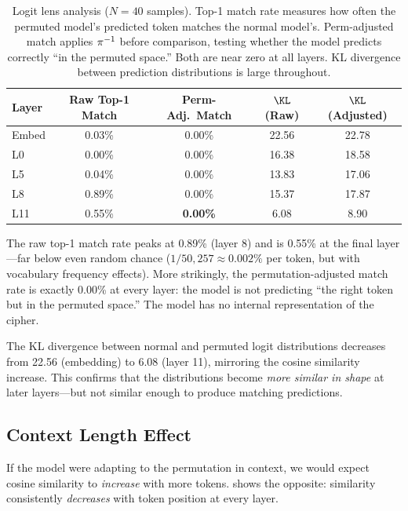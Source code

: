 \begin{table}[t]
    \centering
    \caption{Logit lens analysis ($N=40$ samples). Top-1 match rate measures how often the permuted model's predicted token matches the normal model's. Perm-adjusted match applies $\pi^{-1}$ before comparison, testing whether the model predicts correctly ``in the permuted space.'' Both are near zero at all layers. KL divergence between prediction distributions is large throughout.}
    \label{tab:logitlens}
    \begin{tabular}{@{}lcccc@{}}
        \toprule
        Layer & Raw Top-1 Match & Perm-Adj.\ Match & $\KL$ (Raw) & $\KL$ (Adjusted) \\
        \midrule
        Embed & 0.03\% & 0.00\% & 22.56 & 22.78 \\
        L0 & 0.00\% & 0.00\% & 16.38 & 18.58 \\
        L5 & 0.04\% & 0.00\% & 13.83 & 17.06 \\
        L8 & 0.89\% & 0.00\% & 15.37 & 17.87 \\
        L11 & 0.55\% & \textbf{0.00\%} & 6.08 & 8.90 \\
        \bottomrule
    \end{tabular}
\end{table}

The raw top-1 match rate peaks at 0.89\% (layer 8) and is 0.55\% at the final layer---far below even random chance ($1/50{,}257 \approx 0.002\%$ per token, but with vocabulary frequency effects). More strikingly, the permutation-adjusted match rate is exactly 0.00\% at every layer: the model is not predicting ``the right token but in the permuted space.'' The model has no internal representation of the cipher.

The KL divergence between normal and permuted logit distributions decreases from 22.56 (embedding) to 6.08 (layer 11), mirroring the cosine similarity increase. This confirms that the distributions become \emph{more similar in shape} at later layers---but not similar enough to produce matching predictions.

\subsection{Context Length Effect}
\label{sec:context}

If the model were adapting to the permutation in context, we would expect cosine similarity to \emph{increase} with more tokens.  shows the opposite: similarity consistently \emph{decreases} with token position at every layer.

